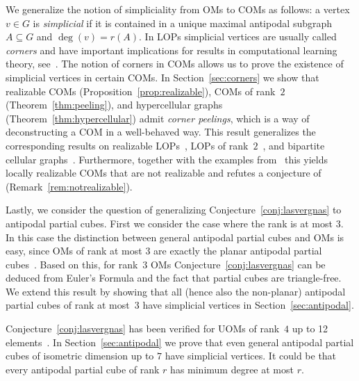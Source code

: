 \documentclass[final,11pt]{article}
\newcommand{\comment}[1]{\textcolor{red}{#1}}
\begin{document}
 We generalize the notion of simpliciality from OMs to COMs as follows: a vertex $v\in G$ is \emph{simplicial} if it is contained in a unique maximal antipodal subgraph $A\subseteq G$ and $\deg(v)=r(A)$. In LOPs simplicial vertices are usually called \emph{corners} and have important implications for results in computational learning theory, see~\cite{Cha-18}.
The notion of corners in COMs allows us to prove the existence of simplicial vertices in certain COMs.
 In Section~\ref{sec:corners} we show that  realizable COMs (Proposition~\ref{prop:realizable}), COMs of rank~$2$ (Theorem~\ref{thm:peeling}), and hypercellular graphs (Theorem~\ref{thm:hypercellular}) admit \emph{corner peelings}, which is a way of deconstructing a COM in a well-behaved way. This result generalizes the corresponding results on realizable LOPs~\cite{Tra-04}, LOPs of rank~$2$~\cite{Cha-18}, and bipartite cellular graphs~\cite{Ban-96}. Furthermore, together with  the examples from~\cite{Ric-93,Bok-01,Tra-04} this yields locally realizable COMs that are not realizable and refutes a conjecture of~\cite[Conjecture 2]{Ban-18} (Remark~\ref{rem:notrealizable}). 

Lastly, we consider the question of generalizing  Conjecture~\ref{conj:lasvergnas} to antipodal partial cubes. First we consider the case where the rank is at most $3$. In this case the distinction between general antipodal partial cubes and OMs is easy, since OMs of rank at most $3$ are exactly the planar antipodal partial cubes~\cite{Fuk-93}. Based on this, for rank~$3$ OMs Conjecture~\ref{conj:lasvergnas} can be deduced from Euler's Formula and the fact that partial cubes are triangle-free. We extend this result by showing that all (hence also the non-planar) antipodal partial cubes of rank at most~3 have simplicial vertices in Section~\ref{sec:antipodal}.

Conjecture~\ref{conj:lasvergnas} has been verified for UOMs of rank~$4$ up to 12 elements~\cite{Bok-01}. In Section~\ref{sec:antipodal} we prove that even general antipodal partial cubes of isometric dimension up to $7$ have simplicial vertices. %
It could be that every antipodal partial cube of rank $r$ has minimum degree at most $r$.
\end{document}
